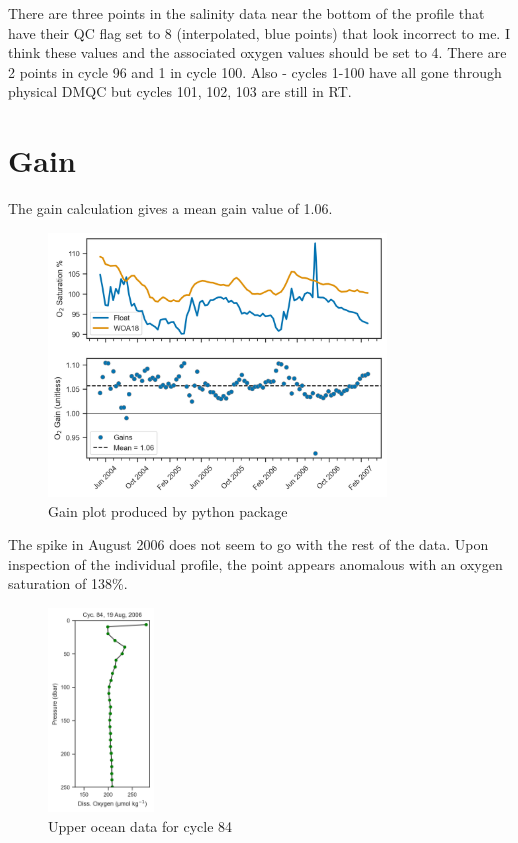 \documentclass[11pt,english]{article} %
\begin{document}
There are three points in the salinity data near the bottom of the profile that
have their QC flag set to 8 (interpolated, blue points) that look incorrect to
me. I think these values and the associated oxygen values should be set to 4.
There are 2 points in cycle 96 and 1 in cycle 100. Also - cycles 1-100 have all
gone through physical DMQC but cycles 101, 102, 103 are still in RT.

\section{Gain}

The gain calculation gives a mean gain value of 1.06.

\begin{figure}[H]
    \centering
    \includegraphics[width=0.8\textwidth]{../figures/4900497/gainplot.png}
    \caption{Gain plot produced by python package}
\end{figure}

The spike in August 2006 does not seem to go with the rest of the data. Upon
inspection of the individual profile, the point appears anomalous with an
oxygen saturation of 138\%.

\begin{figure}[H]
    \centering
    \includegraphics[width=0.25\textwidth]{../figures/4900497/anom_profile.png}
    \caption{Upper ocean data for cycle 84}
\end{figure}
\end{document}

